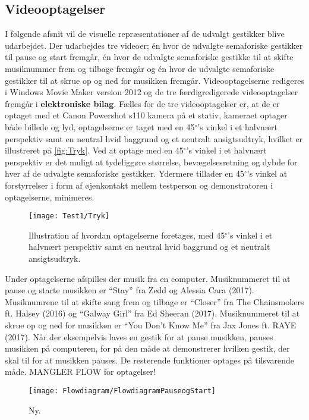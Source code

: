 \subsection{Videooptagelser}
\label{VideooptagelserValgAfGestikker}
%
I følgende afsnit vil de visuelle repræsentationer af de udvalgt gestikker blive udarbejdet. Der udarbejdes tre videoer; én hvor de udvalgte semaforiske gestikker til pause og start fremgår, én hvor de udvalgte semaforiske gestikke til at skifte musiknummer frem og tilbage fremgår og én hvor de udvalgte semaforiske gestikker til at skrue op og ned for musikken fremgår. Videooptagelserne redigeres i Windows Movie Maker version 2012 og de tre færdigredigerede videooptagelser fremgår i \textbf{elektroniske bilag}. 
\blankline
%
Fælles for de tre videooptagelser er, at de er optaget med et Canon Powershot s110 kamera på et stativ, kameraet optager både billede og lyd, optagelserne er taget med en 45$^{\circ}$'s vinkel i et halvnært perspektiv samt en neutral hvid baggrund og et neutralt ansigtsudtryk, hvilket er illustreret på \autoref{fig:Tryk}. Ved at optage med en 45$^{\circ}$'s vinkel i et halvnært perspektiv er det muligt at tydeliggøre størrelse, bevægelsesretning og dybde for hver af de udvalgte semaforiske gestikker. Ydermere tillader en 45$^{\circ}$'s vinkel at forstyrrelser i form af øjenkontakt mellem testperson og demonstratoren i optagelserne, minimeres. 
%
\begin{figure}[H]
	\centering
	\texttt{[image: Test1/Tryk]}
	\caption{Illustration af hvordan optagelserne foretages, med 45$^{\circ}$'s vinkel i et halvnært perspektiv samt en neutral hvid baggrund og et neutralt ansigtsudtryk.}
	\label{fig:Tryk}
\end{figure}
\noindent
%
Under optagelserne afspilles der musik fra en computer. Musiknummeret til at pause og starte musikken er \enquote{Stay} fra Zedd og Alessia Cara (2017). Musiknumrene til at skifte sang frem og tilbage er \enquote{Closer} fra The Chainsmokers ft. Halsey (2016) og \enquote{Galway Girl} fra Ed Sheeran (2017). Musiknummeret til at skrue op og ned for musikken er \enquote{You Don't Know Me} fra Jax Jones ft. RAYE (2017). Når der eksempelvis laves en gestik for at pause musikken, pauses musikken på computeren, for på den måde at demonstrerer hvilken gestik, der skal til for at musikken pauses. De resterende funktioner optages på tilsvarende måde.\blankline
%   
MANGLER FLOW for optagelser!\blankline
%
%
\begin{figure}[H]
	\centering
	\texttt{[image: Flowdiagram/FlowdiagramPauseogStart]}
	\caption{Ny.}
	\label{fig:FlowdiagramPause}
\end{figure}
\noindent
%

